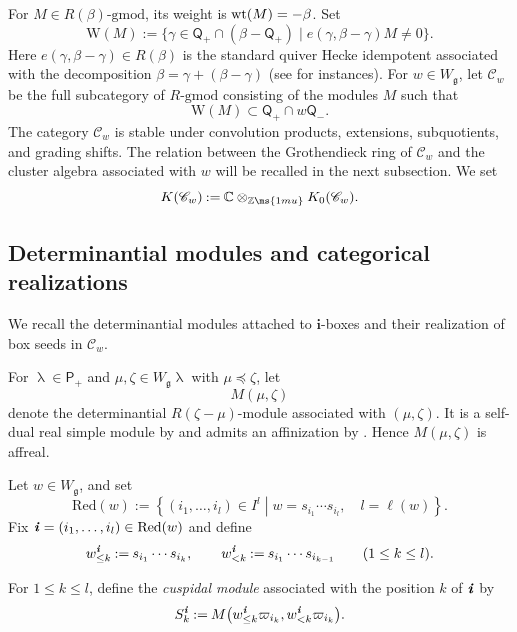 \documentclass[12pt, leqno]{amsart}
\numberwithin{equation}{section}
\theoremstyle{plain}
\theoremstyle{definition}
\renewcommand{\preceq}{\preccurlyeq}
\newcommand{\seteq}{\mathbin{:=}}
\newcommand{\g}{\mathfrak{g}}
\newcommand{\C}{\mathbb{C}}
\newcommand{\Z}{\mathbb{Z}\ms{1mu}}
\newcommand{\wt}{{\rm wt}}
\newcommand{\ii}{ \textbf{\textit{i}}}
\newcommand{\sfP}{\mathsf{P}}
\newcommand{\sfQ}{\mathsf{Q}}
\newcommand{\bfi}{\mathbf{i}}
\newcommand{\scrC}{\mathscr{C}}
\newcommand{\Red}{\mathrm{Red}}
\begin{document}
For \(M\in R(\beta)\text{-gmod}\), its weight is
\(\wt(M)=-\beta\).  Set
\[
\mathrm W(M)
\seteq
\bigl\{
\gamma\in\sfQ_+\cap(\beta-\sfQ_+)
\mid
e(\gamma,\beta-\gamma)M\ne0
\bigr\}.
\]
Here \(e(\gamma,\beta-\gamma)\in R(\beta)\) is the standard quiver
Hecke idempotent associated with the decomposition
\(\beta=\gamma+(\beta-\gamma)\) (see \cite[Section~2.3]{KKOP18} for instances).
For \(w\in W_\g\), let \(\scrC_w\) be the full subcategory of
\(R\text{-gmod}\) consisting of the modules \(M\) such that
\[
\mathrm W(M)\subset\sfQ_+\cap w\sfQ_-.
\]
The category \(\scrC_w\) is stable under convolution products,
extensions, subquotients, and grading shifts.  The relation between
the Grothendieck ring of \(\scrC_w\) and the cluster algebra associated
with \(w\) will be recalled in the next subsection.
We set
\[
K(\scrC_w)\seteq\C\otimes_{\Z}K_0(\scrC_w).
\]

\subsection{Determinantial modules and categorical realizations}
\label{subsec: categorical realizations of box seeds}

We recall the determinantial modules attached to \(\bfi\)-boxes
and their realization of box seeds in \(\scrC_w\).
 
For \(\uplambda\in\sfP_+\) and \(\mu,\zeta\in W_\g\uplambda\) with
\(\mu\preceq\zeta\), let
\[
M(\mu,\zeta)
\]
denote the determinantial \(R(\zeta-\mu)\)-module associated with
\((\mu,\zeta)\).  It is a self-dual real simple module by
\cite[Propositions~4.1 and~4.2]{KKOP18} and admits an affinization by
\cite[Theorem~3.26]{KKOP21}.  Hence \(M(\mu,\zeta)\) is affreal.

Let \(w\in W_\g\), and set
\[
\Red(w) \seteq \left\{ (i_1,\ldots,i_l)\in I^l \mathrel{}\middle|\mathrel{} w=s_{i_1}\cdots s_{i_l},\quad l=\ell(w) \right\}.
\]
Fix $\ii=(i_1,\ldots,i_l)\in\Red(w)$ and define
\[
w_{\leq k}^\ii \seteq s_{i_1}\cdots s_{i_k}, \qquad w_{<k}^\ii \seteq s_{i_1}\cdots s_{i_{k-1}} \qquad(1\leq k\leq l).
\]

For \(1\leq k\leq l\), define the \emph{cuspidal module} associated with
the position \(k\) of \(\ii\) by
\begin{equation}\label{eq: cuspidal determinantial module}
S_k^\ii
\seteq
M\bigl(
w_{\leq k}^\ii\varpi_{i_k},
w_{<k}^\ii\varpi_{i_k}
\bigr).
\end{equation}
\end{document}
